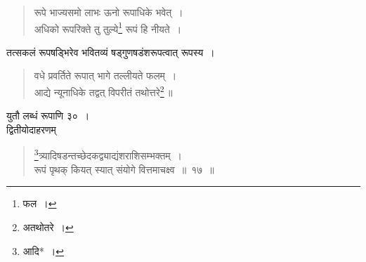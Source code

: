 \documentclass[10pt, openany]{book}
\begin{document}
\begin{quote}
{\qt रूपे भाज्यसमो लाभः ऊनो रूपाधिके भवेत्~। \\
 अधिको रूपरिक्ते तु तुल्ये\renewcommand{\thefootnote}{२}\footnote{फल~।}  रूपं हि नीयते~।}
\end{quote}

{तत्सकलं रूपषड्भिरेव भवितव्यं षड्गुणषडंशरूपत्वात् रूपस्य~।}

\begin{quote}{\qt वधे प्रवर्तिते रूपात् भागे तल्लीयते फलम्~। \\
 आद्ये न्यूनाधिके तद्वत् विपरीतं तथोत्तरे\renewcommand{\thefootnote}{३}\footnote{अतथोतरे~।}\,॥}
\end{quote}

{युतौ लब्धं रूपाणि ३०~।}\\

{द्वितीयोदाहरणम्\textemdash}

\begin{quote}
    
\hspace{-3mm} {\eg \renewcommand{\thefootnote}{\s ४}\footnote{\s आदि*~।}त्र्यादिषडन्तच्छेदकद्व्याद्यंशराशिसम्भक्तम्~। \\
 रूपं पृथक् कियत् स्यात् संयोगे वित्तमाचक्ष्व~॥~१७~॥}\end{quote} 
\end{document}
